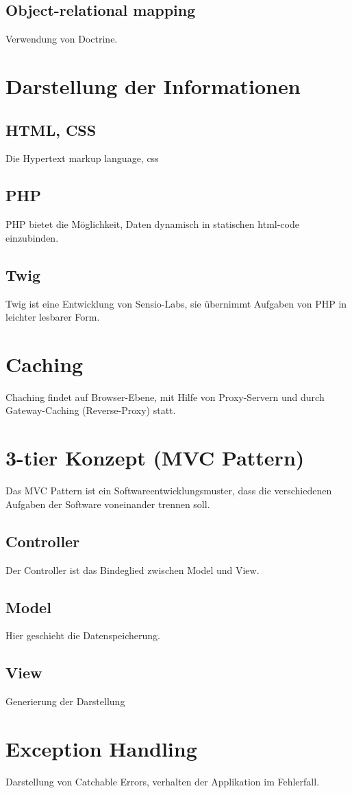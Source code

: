 \documentclass[12pt]{report}
\begin{document}
\subsection{Object-relational mapping}
Verwendung von Doctrine.

\section{Darstellung der Informationen}
\subsection{HTML, CSS}
Die Hypertext markup language, css
\subsection{PHP}
PHP bietet die Möglichkeit, Daten dynamisch in statischen html-code einzubinden.
\subsection{Twig}
Twig ist eine Entwicklung von Sensio-Labs, sie übernimmt Aufgaben von PHP in leichter lesbarer Form.

\section{Caching}
Chaching findet auf Browser-Ebene, mit Hilfe von Proxy-Servern und durch Gateway-Caching (Reverse-Proxy) statt.

\section{3-tier Konzept (MVC Pattern)}
Das MVC Pattern ist ein Softwareentwicklungsmuster, dass die verschiedenen Aufgaben der Software voneinander trennen soll.
\subsection{Controller}
Der Controller ist das Bindeglied zwischen Model und View.
\subsection{Model}
Hier geschieht die Datenspeicherung.
\subsection{View}
Generierung der Darstellung
\section{Exception Handling}
Darstellung von Catchable Errors, verhalten der Applikation im Fehlerfall.
\end{document}

